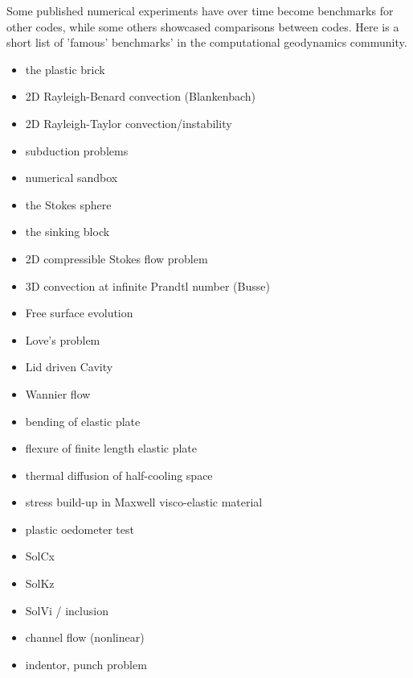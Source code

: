 Some published numerical experiments have over time become benchmarks for other codes, while some 
others showcased comparisons between codes. Here is a short list of 'famous' benchmarks' in the 
computational geodynamics community.

\begin{itemize}
\item the plastic brick \cite{lemm08,kaus10,qurj09,mishin11,maie12}
\item 2D Rayleigh-Benard convection (Blankenbach)  \cite{blbc89,trha98,chhl08,king09,lezh11,vyrc13,trab90}
\item 2D Rayleigh-Taylor convection/instability \cite{pros81,trab90,soga01,bast02,taki03,bomh06, basd08,qurj09,saev10,lezh11,vyrc13,vkks97,bomh06,chtl13,deka08,mishin11,maie12} 
\item subduction problems \cite{scbe08,vack08,cehg14}
\item numerical sandbox \cite{bbeg06,maie12,busa16}
\item the Stokes sphere \cite{galemanual}
\item the sinking block \cite{thie11,cehg14,gery10,geyu03,mishin11,maie12}
\item 2D compressible Stokes flow problem \cite{lezh08}
\item 3D convection at infinite Prandtl number (Busse) \cite{bucc93,trha98}
\item Free surface evolution \cite{crsg12}
\item Love's problem \cite{bebe04}
\item Lid driven Cavity \cite{bope98,kawa61}
\item Wannier flow \cite{wann50,yemu99}
\item bending of elastic plate \cite{cehg14,boht08a}
\item flexure of finite length elastic plate \cite{chtl13}
\item thermal diffusion of half-cooling space \cite{chtl13}
\item stress build-up in Maxwell visco-elastic material \cite{geyu07,chtl13}
\item plastic oedometer test  \cite{chtl13}
\item SolCx
\item SolKz
\item SolVi / inclusion \cite{kapo06,maie12,deka08}
\item channel flow (nonlinear) \cite{maie12,frbt19,gery10}
\item indentor, punch problem \cite{thfb08,mota77}
\end{itemize}

